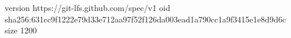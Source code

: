 version https://git-lfs.github.com/spec/v1
oid sha256:631cc9f1222e79d33e712aa97f52f126da003ead1a790cc1a9f3415e1e8d9d6c
size 1200
